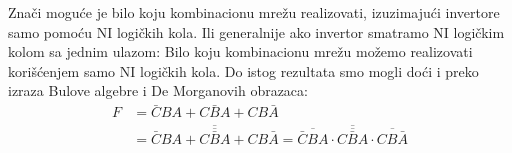 \begin{frame}[label=02-s025]
Znači moguće je bilo koju kombinacionu mrežu realizovati, izuzimajući invertore samo pomoću NI logičkih kola. Ili generalnije ako invertor smatramo NI logičkim kolom sa jednim ulazom: Bilo koju kombinacionu mrežu možemo realizovati korišćenjem samo NI logičkih kola. Do istog rezultata smo mogli doći i preko izraza Bulove algebre i De Morganovih obrazaca:
\[
\begin{aligned}
F&=\bar CBA+C\bar BA+CB\bar A\\
&=\overline{\overline{\bar CBA+C\bar BA+CB\bar A}}
=\overline{\overline{\bar CBA}\cdot\overline{C\bar BA}\cdot\overline{CB\bar A}}
\end{aligned}
\]
\end{frame}
